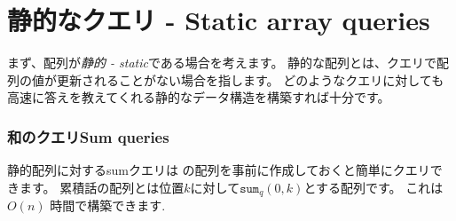 \section{静的なクエリ - Static array queries}

まず、配列が\emph{静的 - static}である場合を考えます。
静的な配列とは、クエリで配列の値が更新されることがない場合を指します。
どのようなクエリに対しても高速に答えを教えてくれる静的なデータ構造を構築すれば十分です。

\subsubsection{和のクエリSum queries}


静的配列に対するsumクエリは
の配列を事前に作成しておくと簡単にクエリできます。
累積話の配列とは位置$k$に対して$\texttt{sum}_q(0,k)$とする配列です。
これは$O(n)$ 時間で構築できます.

